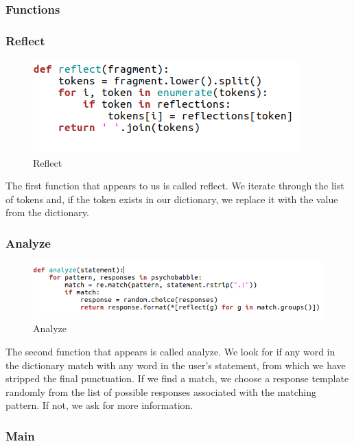 \documentclass[12pt,twoside]{article}
\theoremstyle{plain}
\theoremstyle{definition}
\theoremstyle{remark}
\begin{document}
\subsubsection*{Functions}
	\label{sec:functions}
	
\subsubsection{Reflect}
	\label{sec:reflect}
		
\begin{figure}[h]
\centering
\includegraphics[scale=0.6]{./Pictures/reflect.png}
\caption{Reflect} 
\end{figure}

The first function that appears to us is called reflect. We iterate through the list of tokens and, if the token exists in our dictionary, we replace it with the value from the dictionary.

\subsubsection{Analyze}
	\label{sec:analyze}
		
\begin{figure}[h]
\centering
\includegraphics[scale=0.6]{./Pictures/analyze.png}
\caption{Analyze}
\label{fig:analyze}
\end{figure}

The second function that appears is called analyze. We look for if any word in the dictionary match with any word in the user's statement, from which we have stripped the final punctuation. If we find a match, we choose a response template randomly from the list of possible responses associated with the matching pattern. If not, we ask for more information.

\subsubsection{Main}
	\label{sec:main}
	
\end{document}
